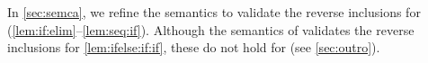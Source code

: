 \begin{lemma}
\begin{enumerate*}[label=(\alph*),ref=\alph*]
    
  \end{enumerate*}      
\end{lemma}
In \textsection\ref{sec:semca}, we refine the semantics to validate the
reverse inclusions for (\ref{lem:if:elim}--\ref{lem:seq:if}).  Although the
semantics of  validates the reverse inclusions for
\eqref{lem:ifelse:if:if}, these do not hold for \PwTmca{} (see \textsection\ref{sec:outro}).

